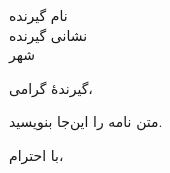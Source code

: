 \documentclass{letter}
\begin{document}
\begin{letter}{نام گیرنده \\ نشانی گیرنده \\ شهر}
\opening{گیرندهٔ گرامی،}

متن نامه را این‌جا بنویسید.

\closing{با احترام،}

\end{letter}
\end{document}
